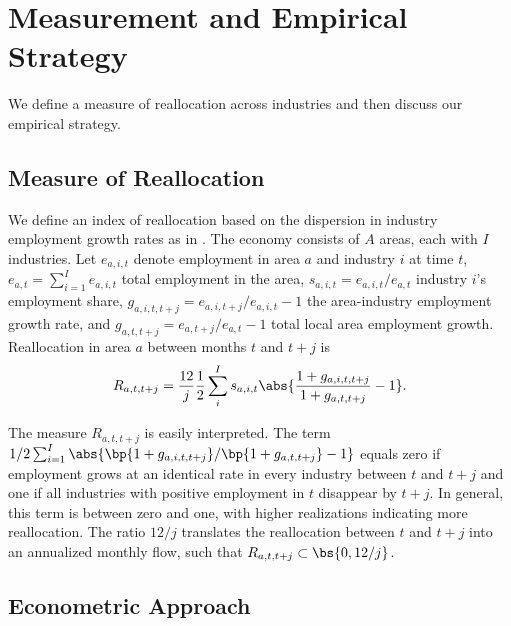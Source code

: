 \documentclass[12pt]{article}
\theoremstyle{definition}
\begin{document}
\section{Measurement and Empirical Strategy}

We define a measure of reallocation across industries and then discuss our empirical strategy.

\subsection{Measure of Reallocation}

We define an index of reallocation based on the dispersion in industry employment growth rates as in \citet{lilienSectoralShiftsCyclical1982}. The economy consists of $A$ areas, each with $I$ industries. Let $e_{a, i, t}$ denote employment in area $a$ and industry $i$ at time $t$, $e_{a,t} = \sum_{i=1}^{I} e_{a, i, t}$ total employment in the area, $s_{a,i,t} = e_{a,i,t} / e_{a,t}$ industry $i$'s employment share, $g_{a, i, t, t+j} = e_{a, i, t+j} / e_{a, i, t} - 1$ the area-industry employment growth rate, and $g_{a, t, t+j} = e_{a, t+j} / e_{a, t} - 1$ total local area employment growth. Reallocation in area $a$ between months $t$ and $t+j$ is 
\begin{equation}
    \label{chodorow-reichSecularLaborReallocation2020_eq1}
    R_{a, t, t+j} = \frac{12}{j} \frac{1}{2} \sum_{i}^{I} s_{a, i, t} \abs{\frac{1 + g_{a, i, t, t+j}}{1 + g_{a, t, t+j}} - 1}.
\end{equation} 

The measure $R_{a, t, t+j}$ is easily interpreted. The term $1/2 \sum_{i=1}^{I} \abs{\bp{1 + g_{a, i, t, t+j}} / \bp{1 + g_{a, t, t+j}} - 1}$ equals zero if employment grows at an identical rate in every industry between $t$ and $t+j$ and one if all industries with positive employment in $t$ disappear by $t+j$. In general, this term is between zero and one, with higher realizations indicating more reallocation. The ratio $12/j$ translates the reallocation between $t$ and $t+j$ into an annualized monthly flow, such that $R_{a, t, t+j} \subset \bs{0, 12/j}$.

\subsection{Econometric Approach}
\end{document}
